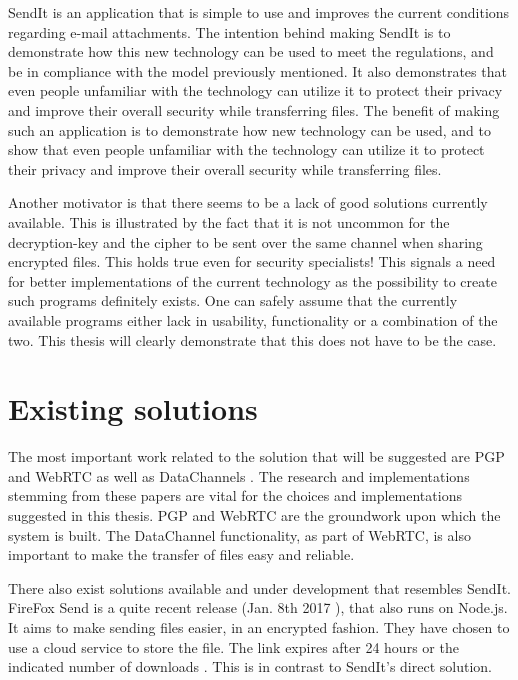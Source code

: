 SendIt is an application that is simple to use and improves the current conditions regarding e-mail attachments. The intention behind making SendIt is to demonstrate how this new technology can be used to meet the regulations, and be in compliance with the model previously mentioned. It also demonstrates that even people unfamiliar with the technology can utilize it to protect their privacy and improve their overall security while transferring files. The benefit of making such an application is to demonstrate how new technology can be used, and to show that even people unfamiliar with the technology can utilize it to protect their privacy and improve their overall security while transferring files.

Another motivator is that there seems to be a lack of good solutions currently available. This is illustrated by the fact that it is not uncommon for the decryption-key and the cipher to be sent over the same channel when sharing encrypted files. This holds true even for security specialists! This signals a need for better implementations of the current technology as the possibility to create such programs definitely exists. One can safely assume that the currently available programs either lack in usability, functionality or a combination of the two. This thesis will clearly demonstrate that this does not have to be the case.
%
\section{Existing solutions}
\label{sec:related}
%
The most important work related to the solution that will be suggested are PGP \cite{ar_pgp} and WebRTC \cite{ar_webrtc} as well as DataChannels \cite{ar_webrtc_dc,url_webrtc_data}.
The research and implementations stemming from these papers are vital for the choices and implementations suggested in this thesis. PGP and WebRTC are the groundwork upon which the system is built. The DataChannel functionality, as part of WebRTC, is also important to make the transfer of files easy and reliable.

There also exist solutions available and under development that resembles SendIt. FireFox Send is a quite recent release (Jan. 8th 2017 ), that also runs on Node.js. It aims to make sending files easier, in an encrypted fashion. They have chosen to use a cloud service to store the file. The link expires after 24 hours or the indicated number of downloads \cite{url_firesend}. This is in contrast to SendIt's direct solution.

